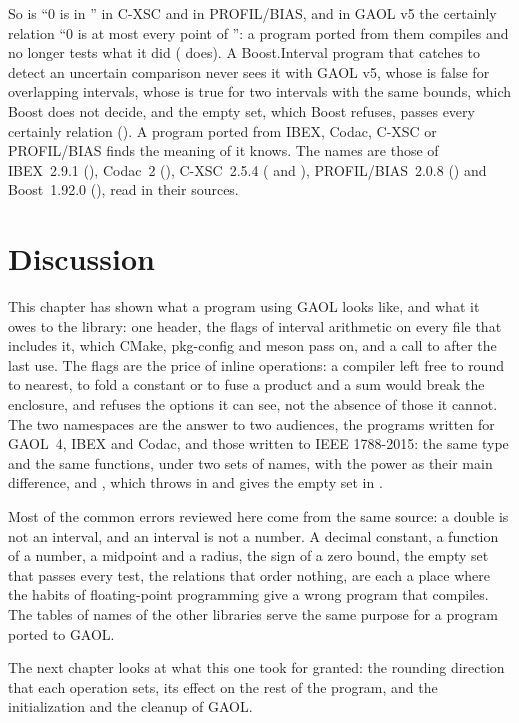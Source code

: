 \noindent
So  is ``0 is in '' in C-XSC and in PROFIL/BIAS, and in
GAOL v5 the certainly relation ``0 is at most every point of '': a
program ported from them compiles and no longer tests what it did
( does). A Boost.Interval program that catches
 to detect an uncertain comparison never sees it with
GAOL v5, whose  is false for overlapping intervals, whose
 is true for two intervals with the same bounds, which Boost
does not decide, and the empty set, which Boost refuses, passes every
certainly relation (). A program ported from
IBEX, Codac, C-XSC or PROFIL/BIAS finds the meaning of \code{==} it knows.
The names are those of IBEX~2.9.1
(), Codac~2 (), C-XSC~2.5.4
( and ), PROFIL/BIAS~2.0.8
() and Boost~1.92.0 (), read in
their sources.

\section{Discussion}

This chapter has shown what a program using GAOL looks like, and what it owes
to the library: one header, the flags of interval arithmetic on every file
that includes it, which CMake, pkg-config and meson pass on, and a call to
 after the last use. The flags are the price of inline
operations: a compiler left free to round to nearest, to fold a constant or
to fuse a product and a sum would break the enclosure, and
 refuses the options it can see, not the absence of
those it cannot. The two namespaces are the answer to two audiences, the
programs written for GAOL~4, IBEX and Codac, and those written to IEEE
1788-2015: the same type and the same functions, under two sets of names,
with the power as their main difference, and , which
throws in  and gives the empty set in .

\medskip
Most of the common errors reviewed here come from the same source: a double is
not an interval, and an interval is not a number. A decimal constant, a
function of a number, a midpoint and a radius, the sign of a zero bound, the
empty set that passes every test, the relations that order nothing, are
each a place where the habits of floating-point programming give a wrong
program that compiles. The tables of names of the other libraries serve the
same purpose for a program ported to GAOL.

\medskip
The next chapter looks at what this one took for granted: the rounding
direction that each operation sets, its effect on the rest of the program,
and the initialization and the cleanup of GAOL.
